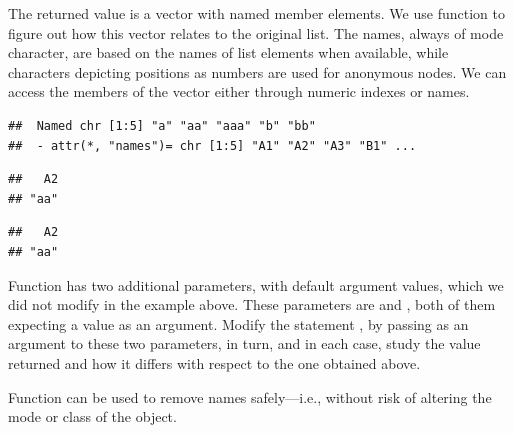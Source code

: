 \documentclass[krantz2]{krantz}\usepackage{knitr}
\begin{document}
The returned value is a vector with named member elements. We use function  to figure out how this vector relates to the original list. The names, always of mode character, are based on the names of list elements when available, while characters depicting positions as numbers are used for anonymous nodes. We can access the members of the vector either through numeric indexes or names.

\begin{knitrout}\footnotesize
{}\color{fgcolor}\begin{kframe}
\begin{alltt}
\end{alltt}
\begin{verbatim}
##  Named chr [1:5] "a" "aa" "aaa" "b" "bb"
##  - attr(*, "names")= chr [1:5] "A1" "A2" "A3" "B1" ...
\end{verbatim}
\begin{alltt}
\hlstd{c.vec[}\hlstd{]}
\end{alltt}
\begin{verbatim}
##   A2 
## "aa"
\end{verbatim}
\begin{alltt}
\hlstd{c.vec[}\hlstd{]}
\end{alltt}
\begin{verbatim}
##   A2 
## "aa"
\end{verbatim}
\end{kframe}
\end{knitrout}

\begin{playground}
Function  has two additional parameters, with default argument values, which we did not modify in the example above. These parameters are  and , both of them expecting a  value as an argument. Modify the statement , by passing  as an argument to these two parameters, in turn, and in each case, study the value returned and how it differs with respect to the one obtained above.
\end{playground}

Function  can be used to remove names safely---i.e., without risk of altering the mode or class of the object.
\end{document}
